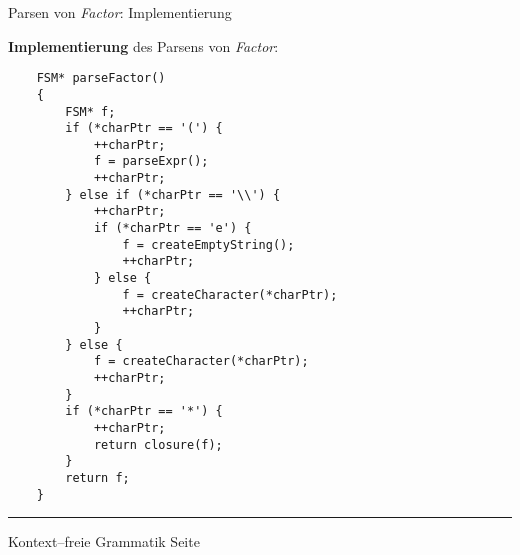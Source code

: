 
\begin{slide}{}
\normalsize

\begin{center}
Parsen von \textsl{Factor}: Implementierung
\end{center}
\vspace*{0.5cm}

\footnotesize
\textbf{Implementierung} des Parsens von \textsl{Factor}:
\begin{verbatim}
    FSM* parseFactor()
    {
        FSM* f;
        if (*charPtr == '(') {
            ++charPtr;
            f = parseExpr();
            ++charPtr;
        } else if (*charPtr == '\\') {
            ++charPtr;
            if (*charPtr == 'e') {
                f = createEmptyString();
                ++charPtr;
            } else {
                f = createCharacter(*charPtr);
                ++charPtr;
            }       
        } else {
            f = createCharacter(*charPtr);
            ++charPtr;
        }
        if (*charPtr == '*') {
            ++charPtr;
            return closure(f);
        }
        return f;
    }
\end{verbatim}


\vspace*{\fill}
\tiny \addtocounter{mypage}{1}
\rule{17cm}{1mm}
Kontext--freie Grammatik  \hspace*{\fill} Seite 
\end{slide}


